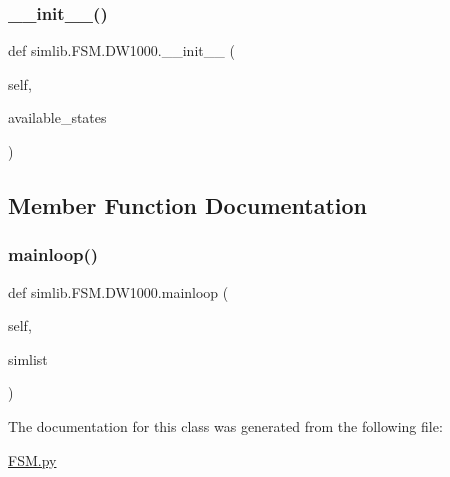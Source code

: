 \subsubsection{\texorpdfstring{\+\_\+\+\_\+init\+\_\+\+\_\+()}{\_\_init\_\_()}}
{\footnotesize\ttfamily def simlib.\+F\+S\+M.\+D\+W1000.\+\_\+\+\_\+init\+\_\+\+\_\+ (\begin{DoxyParamCaption}\item[{}]{self,  }\item[{}]{available\+\_\+states }\end{DoxyParamCaption})}



\subsection{Member Function Documentation}
\mbox{\label{classsimlib_1_1_f_s_m_1_1_d_w1000_aa91a241f59daa1f2479f0d19f60c6124}} 
\subsubsection{\texorpdfstring{mainloop()}{mainloop()}}
{\footnotesize\ttfamily def simlib.\+F\+S\+M.\+D\+W1000.\+mainloop (\begin{DoxyParamCaption}\item[{}]{self,  }\item[{}]{simlist }\end{DoxyParamCaption})}



The documentation for this class was generated from the following file\+:\begin{DoxyCompactItemize}
\item 
\mbox{\hyperlink{_f_s_m_8py}{F\+S\+M.\+py}}\end{DoxyCompactItemize}
